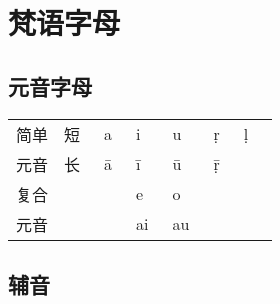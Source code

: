 \documentclass[17pt]{beamer}
\newcommand{\skt}[1]{{\sanskritfont{#1}}} %
\newcommand{\skttrans}[1]{{\skt{#1}~#1}}  %
\begin{document}
\section{梵语字母}
\begin{frame}{\insertsection }
    \tableofcontents[currentsection]
\end{frame}

\subsection{元音字母}

\begin{frame}{\insertsubsection }
    \begin{tabular}{@{}llllllll@{}} %
    简单 & 短  & \skttrans{a} & \skttrans{i} & \skttrans{u} & \skttrans{ṛ} & \skttrans{ḷ}   \\
    元音  & 长  & \skttrans{ā} & \skttrans{ī} & \skttrans{ū} & \skttrans{ṝ} &  \\
    复合 &    & & \skttrans{e} & \skttrans{o} & & \\
    元音  &   &  & \skttrans{ai} & \skttrans{au} & & \\
    \end{tabular}
\end{frame}

\subsection{辅音}
\end{document}
